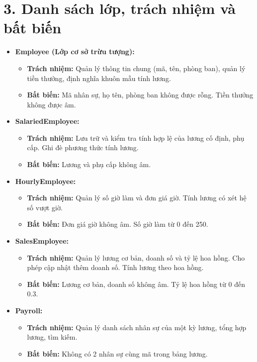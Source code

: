 \documentclass[12pt,a4paper]{article}
\begin{document}
\section{3. Danh sách lớp, trách nhiệm và bất biến}
\begin{itemize}
    \item \textbf{Employee (Lớp cơ sở trừu tượng):}
    \begin{itemize}
        \item \textbf{Trách nhiệm:} Quản lý thông tin chung (mã, tên, phòng ban), quản lý tiền thưởng, định nghĩa khuôn mẫu tính lương.
        \item \textbf{Bất biến:} Mã nhân sự, họ tên, phòng ban không được rỗng. Tiền thưởng không được âm.
    \end{itemize}
    \item \textbf{SalariedEmployee:}
    \begin{itemize}
        \item \textbf{Trách nhiệm:} Lưu trữ và kiểm tra tính hợp lệ của lương cố định, phụ cấp. Ghi đè phương thức tính lương.
        \item \textbf{Bất biến:} Lương và phụ cấp không âm.
    \end{itemize}
    \item \textbf{HourlyEmployee:}
    \begin{itemize}
        \item \textbf{Trách nhiệm:} Quản lý số giờ làm và đơn giá giờ. Tính lương có xét hệ số vượt giờ.
        \item \textbf{Bất biến:} Đơn giá giờ không âm. Số giờ làm từ 0 đến 250.
    \end{itemize}
    \item \textbf{SalesEmployee:}
    \begin{itemize}
        \item \textbf{Trách nhiệm:} Quản lý lương cơ bản, doanh số và tỷ lệ hoa hồng. Cho phép cập nhật thêm doanh số. Tính lương theo hoa hồng.
        \item \textbf{Bất biến:} Lương cơ bản, doanh số không âm. Tỷ lệ hoa hồng từ 0 đến 0.3.
    \end{itemize}
    \item \textbf{Payroll:}
    \begin{itemize}
        \item \textbf{Trách nhiệm:} Quản lý danh sách nhân sự của một kỳ lương, tổng hợp lương, tìm kiếm.
        \item \textbf{Bất biến:} Không có 2 nhân sự cùng mã trong bảng lương.
    \end{itemize}
\end{itemize}
\end{document}
